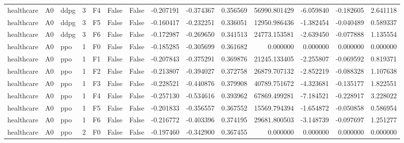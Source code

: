 \begin{tabular}{lllrlllrrrrrrr}
healthcare &      A0 &      ddpg &     3 &  F4 &           False &            False & -0.207191 & -0.374367 & 0.356569 &     56990.801429 &          -6.059840 &       -0.182605 &            2.641118 \\
healthcare &      A0 &      ddpg &     3 &  F5 &           False &            False & -0.160417 & -0.232251 & 0.336051 &     12950.986436 &          -1.382454 &       -0.040489 &            0.589337 \\
healthcare &      A0 &      ddpg &     3 &  F6 &           False &            False & -0.172987 & -0.269650 & 0.341513 &     24773.153581 &          -2.639450 &       -0.077888 &            1.135554 \\
healthcare &      A0 &       ppo &     1 &  F0 &           False &            False & -0.185285 & -0.305699 & 0.361682 &         0.000000 &           0.000000 &        0.000000 &            0.000000 \\
healthcare &      A0 &       ppo &     1 &  F1 &           False &            False & -0.207843 & -0.375291 & 0.369876 &     21245.133405 &          -2.255807 &       -0.069592 &            0.819371 \\
healthcare &      A0 &       ppo &     1 &  F2 &           False &            False & -0.213807 & -0.394027 & 0.372758 &     26879.707132 &          -2.852219 &       -0.088328 &            1.107638 \\
healthcare &      A0 &       ppo &     1 &  F3 &           False &            False & -0.228521 & -0.440876 & 0.379908 &     40789.751672 &          -4.323681 &       -0.135177 &            1.822551 \\
healthcare &      A0 &       ppo &     1 &  F4 &           False &            False & -0.257130 & -0.534616 & 0.393962 &     67869.499281 &          -7.184521 &       -0.228917 &            3.228022 \\
healthcare &      A0 &       ppo &     1 &  F5 &           False &            False & -0.201833 & -0.356557 & 0.367552 &     15569.794394 &          -1.654872 &       -0.050858 &            0.586954 \\
healthcare &      A0 &       ppo &     1 &  F6 &           False &            False & -0.216772 & -0.403396 & 0.374195 &     29681.800503 &          -3.148739 &       -0.097697 &            1.251277 \\
healthcare &      A0 &       ppo &     2 &  F0 &           False &            False & -0.197460 & -0.342900 & 0.367455 &         0.000000 &           0.000000 &        0.000000 &            0.000000 \\

\end{tabular}
